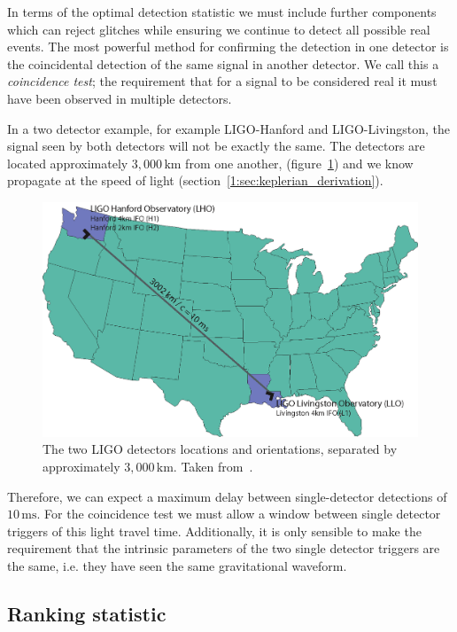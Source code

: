 In terms of the optimal detection statistic we must include further components which can reject glitches while ensuring we continue to detect all possible real events. The most powerful method for confirming the detection in one detector is the coincidental detection of the same signal in another detector. We call this a \textit{coincidence test}; the requirement that for a signal to be considered real it must have been observed in multiple detectors.

In a two detector example, for example LIGO-Hanford and LIGO-Livingston, the signal seen by both detectors will not be exactly the same. The detectors are located approximately $3,000 \, \text{km}$ from one another, (figure~\ref{2:fig:observatories}) and we know \gws propagate at the speed of light (section~\ref{1:sec:keplerian_derivation}).
%
\begin{figure}
    \centering
    \includegraphics[width=0.8\linewidth]{images/2_searches/observatories.png}
    \caption{The two LIGO detectors locations and orientations, separated by approximately $3,000 \, \text{km}$. Taken from~\cite{Brown_Thesis:2004}.}
    \label{2:fig:observatories}
\end{figure}
%
Therefore, we can expect a maximum delay between single-detector detections of $10 \, \text{ms}$. For the coincidence test we must allow a window between single detector triggers of this light travel time. Additionally, it is only sensible to make the requirement that the intrinsic parameters of the two single detector triggers are the same, i.e. they have seen the same gravitational waveform.


\subsection{\label{2:sec:ranking-statistic}Ranking statistic}

